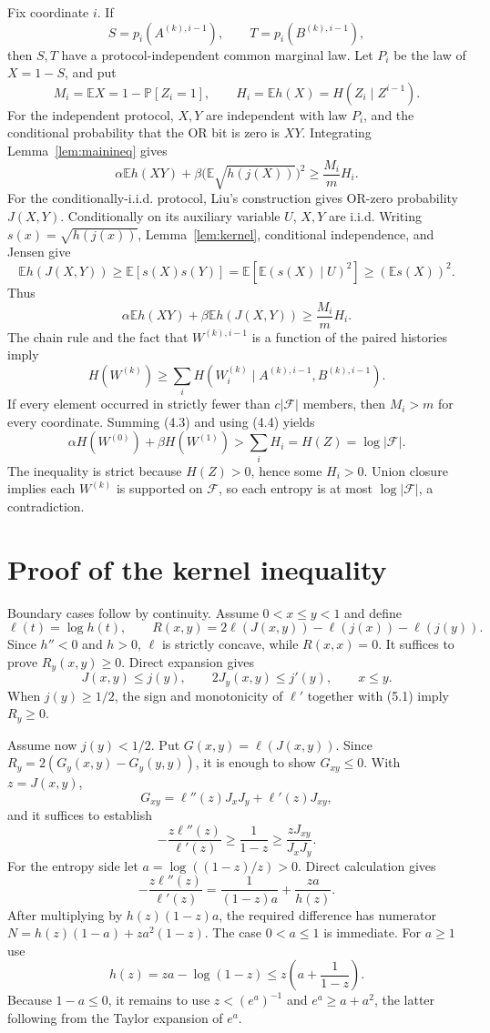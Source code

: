 \documentclass[11pt]{article}
\newcommand{\F}{\mathcal F}
\newcommand{\E}{\mathbb E}
\newcommand{\Prb}{\mathbb P}
\begin{document}
Fix coordinate $i$. If
\[
S=p_i(A^{(k),i-1}),\qquad T=p_i(B^{(k),i-1}),
\]
then $S,T$ have a protocol-independent common marginal law. Let $P_i$ be the
law of $X=1-S$, and put
\[
M_i=\E X=1-\Prb[Z_i=1],\qquad
H_i=\E h(X)=H(Z_i\mid Z^{i-1}).
\]
For the independent protocol, $X,Y$ are independent with law $P_i$, and the
conditional probability that the OR bit is zero is $XY$. Integrating
Lemma~\ref{lem:mainineq} gives
\[
\alpha\E h(XY)+\beta\bigl(\E\sqrt{h(j(X))}\bigr)^2
\ge\frac{M_i}{m}H_i. \tag{4.1}
\]
For the conditionally-i.i.d. protocol, Liu's construction gives OR-zero
probability $J(X,Y)$. Conditionally on its auxiliary variable $U$, $X,Y$ are
i.i.d. Writing $s(x)=\sqrt{h(j(x))}$, Lemma~\ref{lem:kernel}, conditional
independence, and Jensen give
\[
\E h(J(X,Y))\ge\E[s(X)s(Y)]
=\E[\E(s(X)\mid U)^2]\ge(\E s(X))^2. \tag{4.2}
\]
Thus
\[
\alpha\E h(XY)+\beta\E h(J(X,Y))\ge\frac{M_i}{m}H_i. \tag{4.3}
\]
The chain rule and the fact that $W^{(k),i-1}$ is a function of the paired
histories imply
\[
H(W^{(k)})\ge\sum_i H(W_i^{(k)}\mid A^{(k),i-1},B^{(k),i-1}). \tag{4.4}
\]
If every element occurred in strictly fewer than $c|\F|$ members, then
$M_i>m$ for every coordinate. Summing (4.3) and using (4.4) yields
\[
\alpha H(W^{(0)})+\beta H(W^{(1)})
>\sum_iH_i=H(Z)=\log|\F|.
\]
The inequality is strict because $H(Z)>0$, hence some $H_i>0$. Union closure
implies each $W^{(k)}$ is supported on $\F$, so each entropy is at most
$\log|\F|$, a contradiction.

\section{Proof of the kernel inequality}\label{sec:kernel}

Boundary cases follow by continuity. Assume $0<x\le y<1$ and define
\[
\ell(t)=\log h(t),\qquad
R(x,y)=2\ell(J(x,y))-\ell(j(x))-\ell(j(y)).
\]
Since $h''<0$ and $h>0$, $\ell$ is strictly concave, while $R(x,x)=0$.
It suffices to prove $R_y(x,y)\ge0$. Direct expansion gives
\[
J(x,y)\le j(y),\qquad 2J_y(x,y)\le j'(y),\qquad x\le y. \tag{5.1}
\]
When $j(y)\ge1/2$, the sign and monotonicity of $\ell'$ together with (5.1)
imply $R_y\ge0$.

Assume now $j(y)<1/2$. Put $G(x,y)=\ell(J(x,y))$. Since
$R_y=2(G_y(x,y)-G_y(y,y))$, it is enough to show $G_{xy}\le0$. With
$z=J(x,y)$,
\[
G_{xy}=\ell''(z)J_xJ_y+\ell'(z)J_{xy},
\]
and it suffices to establish
\[
-\frac{z\ell''(z)}{\ell'(z)}\ge\frac1{1-z}
\ge\frac{zJ_{xy}}{J_xJ_y}. \tag{5.2}
\]
For the entropy side let $a=\log((1-z)/z)>0$. Direct calculation gives
\[
-\frac{z\ell''(z)}{\ell'(z)}
=\frac1{(1-z)a}+\frac{za}{h(z)}.
\]
After multiplying by $h(z)(1-z)a$, the required difference has numerator
$N=h(z)(1-a)+za^2(1-z)$. The case $0<a\le1$ is immediate. For $a\ge1$ use
\[
h(z)=za-\log(1-z)\le z\left(a+\frac1{1-z}\right).
\]
Because $1-a\le0$, it remains to use $z<(e^a)^{-1}$ and
$e^a\ge a+a^2$, the latter following from the Taylor expansion of $e^a$.
\end{document}
